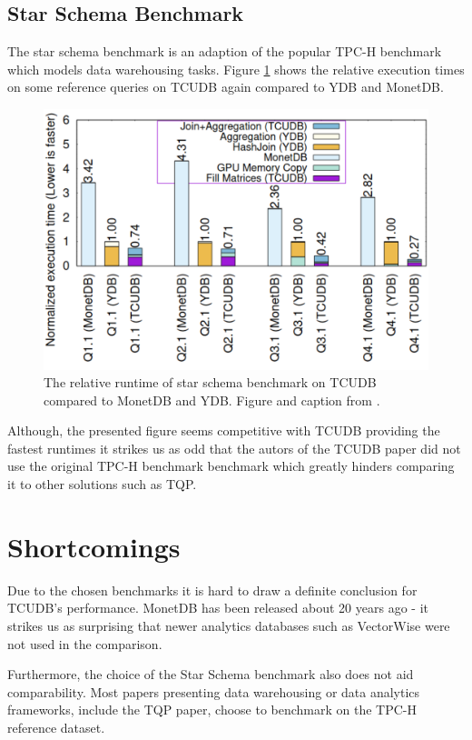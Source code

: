 \documentclass{paper}
\begin{document}
	\subsection{Star Schema Benchmark}
	The star schema benchmark \cite{o2009star} is an adaption of the popular TPC-H benchmark \cite{specification1993tpc} which models data warehousing tasks. Figure \ref{fig:bench4} shows the relative execution times on some reference queries on TCUDB again compared to YDB and MonetDB.
		\begin{figure}
		\centering
		\includegraphics[width=0.9\linewidth]{bench4}
		\caption{The relative runtime of star schema benchmark on TCUDB compared to MonetDB and YDB. Figure and caption from \cite{hu2021tcudb}.}
		\label{fig:bench4}
	\end{figure}
	Although, the presented figure seems competitive with TCUDB providing the fastest runtimes it strikes us as odd that the autors of the TCUDB paper did not use the original TPC-H benchmark \cite{specification1993tpc} benchmark which greatly hinders comparing it to other solutions such as TQP.
	
	
	\section{Shortcomings}
	
	Due to the chosen benchmarks it is hard to draw a definite conclusion for TCUDB's performance. MonetDB has been released about 20 years ago - it strikes us as surprising that newer analytics databases such as VectorWise were not used in the comparison.
	
	Furthermore, the choice of the Star Schema benchmark also does not aid comparability. Most papers presenting data warehousing or data analytics frameworks, include the TQP paper, choose to benchmark on the TPC-H \cite{specification1993tpc} reference dataset.
	
\end{document}
